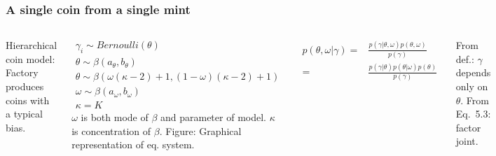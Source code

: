\documentclass[usenames,dvipsnames,table]{beamer}
\begin{document}
\begin{frame}
\frametitle{A single coin from a single mint}
\begin{columns}[c]
\small
Hierarchical coin model: Factory produces coins with a typical bias.

{\tiny%
\begin{align*}
\gamma_i \sim Bernoulli(\theta)\tag{9.2}\\
\theta \sim \beta(a_\theta, b_\theta)\tag{9.3}\\
\theta \sim \beta(\omega(\kappa-2)+1, (1-\omega)(\kappa-2)+1)\tag{9.4}\\
\omega \sim \beta(a_\omega, b_\omega)\tag{9.5}\\
\kappa = K
\end{align*}}
\noindent $\omega$ is both mode of $\beta$ and parameter of model. $\kappa$ is concentration of $\beta$. Figure: Graphical representation of eq. system.

{\tiny%
\begin{align*}
p(\theta, \omega|\gamma) =& \frac{p(\gamma|\theta, \omega)p(\theta, \omega)}
                                {p(\gamma)}\\
                         =& \frac{p(\gamma|\theta)p(\theta|\omega)p(\theta)}
                                {p(\gamma)}\tag{9.6}
\end{align*}}

From def.: $\gamma$ depends only on $\theta$. From Eq.~5.3: factor joint.

\begin{figure}
\centering
\includegraphics[width=\linewidth]{img/fig9_1}
\end{figure}
\end{columns}
\end{frame}
\end{document}

